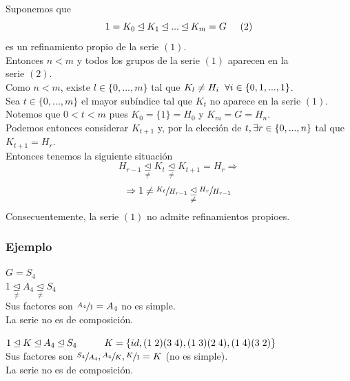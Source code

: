 \documentclass[11pt,a4paper]{article}
\begin{document}
\begin{enumerate}
Suponemos que
$$1 = K_{0} \unlhd K_{1} \unlhd ... \unlhd K_{m} = G \hspace{0.5cm} (2)$$
es un refinamiento propio de la serie $(1)$. \\
Entonces $n < m$ y todos los grupos de la serie $(1)$ aparecen en la \\ serie $(2)$. \\
Como $n < m$, existe $l \in \{0, ..., m\}$ tal que $K_{l} \neq H_{i} \hspace{0.2cm} \forall i \in \{0, 1, ..., 1\}$. \\
Sea $t \in \{0, ..., m\}$ el mayor subíndice tal que $K_{t}$ no aparece en la serie $(1)$. \\
Notemos que $0 < t < m$ pues $K_{0} = \{1\} = H_{0}$ y $K_{m} = G = H_{n}$. \\
Podemos entonces considerar $K_{t+1}$ y, por la elección de $t, \\ \exists r \in \{0, ..., n\}$ tal que $K_{t+1} = H_{r}$. \\
Entonces tenemos la siguiente situación
$$H_{r-1} \underset{\neq}{\unlhd} K_{t} \underset{\neq}{\unlhd} K_{t+1} = H_{r} \Rightarrow$$
$$\Rightarrow 1 \neq \sfrac{K_{t}}{H_{r-1}} \underset{\neq}{\unlhd} \sfrac{H_{r}}{H_{r-1}}$$
Consecuentemente, la serie $(1)$ no admite refinamientos propioes. 
\end{enumerate}

\subsubsection*{Ejemplo}

$G = S_{4}$ \\
$1 \underset{\neq}{\unlhd} A_{4} \underset{\neq}{\unlhd} S_{4}$ \\
Sus factores son $\sfrac{A_{4}}{1} = A_{4}$ no es simple. \\
La serie no es de composición.

$1 \unlhd K \unlhd A_{4} \unlhd S_{4} \hspace{1cm} K = \{id, (1 \hspace{0.1cm} 2)(3 \hspace{0.1cm} 4), (1 \hspace{0.1cm} 3)(2 \hspace{0.1cm} 4), (1 \hspace{0.1cm} 4)(3 \hspace{0.1cm} 2)\}$ \\
Sus factores son $\sfrac{S_{4}}{A_{4}}, \sfrac{A_{4}}{K}, \sfrac{K}{1} = K$ (no es simple). \\
La serie no es de composición.
\end{document}
